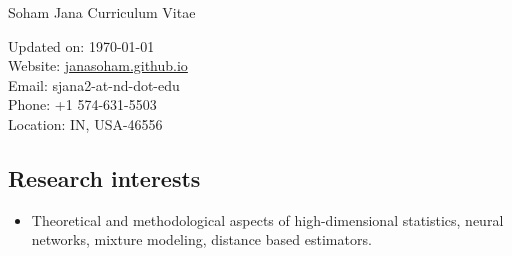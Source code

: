 \documentclass[letterpaper,12pt,oneside]{article}
\theoremstyle{definition}
\begin{document}
			
			
			\noindent  \Huge{Soham Jana} \hfill \LARGE{Curriculum Vitae} \\
			\vspace{1ex} 
			\normalsize
			
			\hfill
			\begin{minipage}{2.1in}
				Updated on: \today\\
				Website: \href{https://janasoham.github.io/}{janasoham.github.io}\\
				Email: {sjana2-at-nd-dot-edu}\\
				Phone: +1 574-631-5503\\
				Location: IN, USA-46556
			\end{minipage}
			\vspace{0.4cm}
			
			
			
			
			\subsection*{Research interests}
			
			
			\begin{itemize}
				\item[] Theoretical and methodological aspects of high-dimensional statistics, neural networks, mixture modeling, distance based estimators.
			\end{itemize}
			
\end{document}
